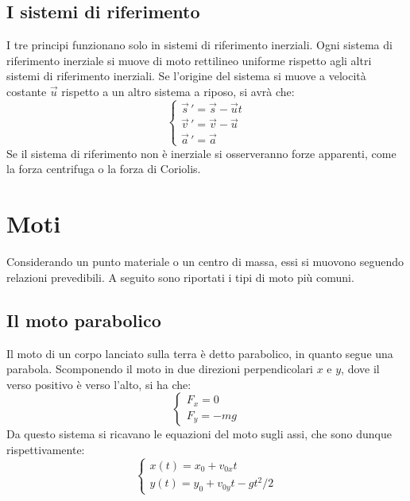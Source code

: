 \documentclass{article}
\begin{document}
\subsection{I sistemi di riferimento}
I tre principi funzionano solo in sistemi di riferimento inerziali.
Ogni sistema di riferimento inerziale si muove di moto rettilineo uniforme rispetto agli altri sistemi di riferimento inerziali.
Se l'origine del sistema si muove a velocità costante $\Vec{u}$ rispetto a un altro sistema a riposo, si avrà che:
\begin{equation}
    \begin{cases}
        \vec{s}\,'=\vec{s}-\vec{u}t \\
        \vec{v}\,'=\vec{v}-\vec{u}\\
        \vec{a}\,'=\vec{a}
    \end{cases}
\end{equation}
Se il sistema di riferimento non è inerziale si osserveranno forze apparenti, come la forza centrifuga o la forza di Coriolis.


\section{Moti}
Considerando un punto materiale o un centro di massa, essi si muovono seguendo relazioni prevedibili. A seguito sono riportati i tipi di moto più comuni.

\subsection{Il moto parabolico}
Il moto di un corpo lanciato sulla terra è detto parabolico, in quanto segue una parabola. Scomponendo il moto in due direzioni perpendicolari $x$ e $y$, dove il verso positivo è verso l'alto, si ha che:
\begin{equation}
    \begin{cases}
        F_x=0\\
        F_y=-mg
    \end{cases}
\end{equation}
Da questo sistema si ricavano le equazioni del moto sugli assi, che sono dunque rispettivamente:
\begin{equation}
    \begin{cases}
        x(t)=x_0+v_{0x}t \\
        y(t)=y_0+v_{0y}t-gt^2/2
    \end{cases}
\end{equation}
\end{document}
